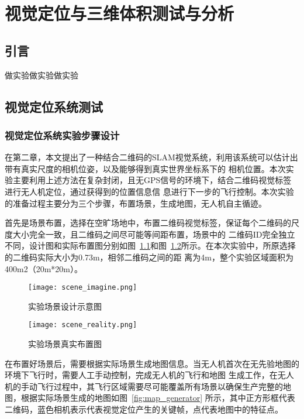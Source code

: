 \chapter{视觉定位与三维体积测试与分析}
\label{cha:chap5}
\section{引言}
\label{sec:5.1}
做实验做实验做实验
\section{视觉定位系统测试}
\label{sec:5.2}
\subsection{视觉定位系统实验步骤设计}
\label{sec:5.2.1}
在第二章，本文提出了一种结合二维码的SLAM视觉系统，利用该系统可以估计出带有真实尺度的相机位姿，以及能够得到真实世界坐标系下的
相机位置。本次实验主要利用上述方法在复杂封闭，且无GPS信号的环境下，结合二维码视觉标签进行无人机定位，通过获得到的位置信息信
息进行下一步的飞行控制。本次实验的准备过程主要分为三个步骤，布置场景，生成地图，无人机自主循迹。

首先是场景布置，选择在空旷场地中，布置二维码视觉标签，保证每个二维码的尺度大小完全一致，且二维码之间尽可能等间距布置，场景中的
二维码ID完全独立不同，设计图和实际布置图分别如图~\ref{fig:scene_imagine}和图~\ref{fig:scene_reality}所示。在本次实验中，所原选择的二维码实际大小为0.73m，相邻二维码之间的距
离为4m，整个实验区域面积为400m2（20m*20m）。

\begin{figure}[H] %
  \centering
  \texttt{[image: scene\_imagine.png]}
  \caption{实验场景设计示意图}
  \label{fig:scene_imagine}
\end{figure}
\begin{figure}[H] %
  \centering
  \texttt{[image: scene\_reality.png]}
  \caption{实验场景真实布置图}
  \label{fig:scene_reality}
\end{figure}

在布置好场景后，需要根据实际场景生成地图信息。当无人机首次在无先验地图的环境下飞行时，需要人工手动控制，完成无人机的飞行和地图
生成工作，在无人机的手动飞行过程中，其飞行区域需要尽可能覆盖所有场景以确保生产完整的地图，根据实际场景生成的地图如图~\ref{fig:map_generator}
所示，其中正方形框代表二维码，蓝色相机表示代表视觉定位产生的关键帧，点代表地图中的特征点。

